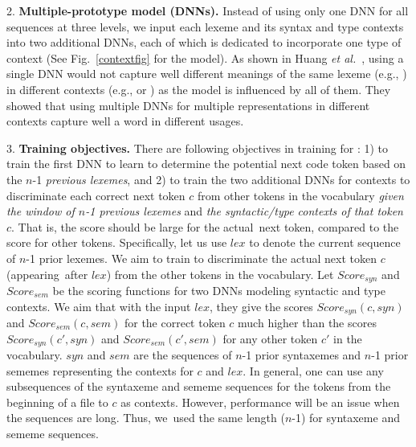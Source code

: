 2. {\bf Multiple-prototype model (DNNs).} Instead of using only one
DNN for all sequences at three levels, we input each lexeme and its
syntax and type contexts into two additional DNNs, each of which is
dedicated to incorporate one type of context (See Fig.~\ref{contextfig}
for the model).
%
As shown in Huang {\em et al.}~\cite{huang12}, using a single DNN
would not capture well different meanings of the same lexeme (e.g.,
) in different contexts (e.g.,  or
) as the model is influenced by all of them. They
showed that using multiple DNNs for multiple
representations in different contexts capture well a word in different
usages.

3. {\bf Training objectives.}  There are following objectives in
training for {\tool}: 1) to train the first DNN to learn to determine
the potential next code token based on the $n$-1 {\em previous
  lexemes}, and 2) to train the two additional DNNs for contexts to
discriminate each correct next token $c$ from other tokens in the
vocabulary {\em given the window of $n$-1 previous lexemes} and {\em
  the syntactic/type contexts of that token $c$}. 
%
That is, the score should be large for the actual~next token, compared
to the score for other tokens.
%
Specifically, let us use $lex$ to denote the current sequence of $n$-1
prior lexemes. We aim to train {\tool} to discriminate the actual next
token $c$ (appearing~after $lex$) from the other tokens in the
vocabulary.
%
Let $Score_{syn}$ and $Score_{sem}$ be the scoring functions for two
DNNs  modeling syntactic and type contexts.  We aim
that with the input $lex$, they give the scores $Score_{syn}(c,syn)$
and $Score_{sem}(c,sem)$ for the correct token $c$ much higher than
the scores $Score_{syn}(c',syn)$ and $Score_{sem}(c',sem)$ for any
other token $c'$ in the vocabulary.
%
$syn$ and $sem$ are the sequences of $n$-1 prior syntaxemes and $n$-1
prior sememes representing the contexts for $c$ and $lex$. In
general, one can use any subsequences of the syntaxeme and sememe
sequences for the tokens from the beginning of a file to $c$ as
contexts.
%
However, performance will be an issue when the sequences are
long. Thus, we~used the same length ($n$-1) for syntaxeme and sememe
sequences.



